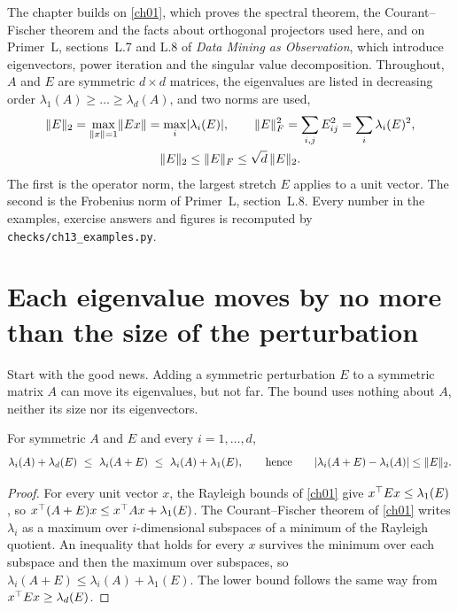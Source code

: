 The chapter builds on \cref{ch01}, which proves the spectral theorem, the
Courant--Fischer theorem and the facts about orthogonal projectors used here,
and on Primer~L, sections~L.7 and L.8 of \emph{Data Mining as Observation},
which introduce eigenvectors, power iteration and the singular value
decomposition. Throughout, $A$ and $E$ are symmetric $d\times d$ matrices, the
eigenvalues are listed in decreasing order $\lambda_1(A)\ge\dots\ge\lambda_d(A)$,
and two norms are used,
\begin{equation}\label{eq:ch13:norms}
\begin{gathered}
\lVert E\rVert_2=\max_{\lVert x\rVert=1}\lVert Ex\rVert=\max_i\lvert \lambda_i(E)\rvert,\qquad
\lVert E\rVert_F^2=\sum_{i,j}E_{ij}^2=\sum_i\lambda_i(E)^2,\\
\lVert E\rVert_2\le\lVert E\rVert_F\le\sqrt d\,\lVert E\rVert_2 .
\end{gathered}
\end{equation}
The first is the operator norm, the largest stretch $E$ applies to a unit
vector. The second is the Frobenius norm of Primer~L, section~L.8. Every number
in the examples, exercise answers and figures is recomputed by
\texttt{checks/ch13\_examples.py}.

\section{Each eigenvalue moves by no more than the size of the perturbation}\label{sec:ch13:weyl}

Start with the good news. Adding a symmetric perturbation $E$ to a symmetric
matrix $A$ can move its eigenvalues, but not far. The bound uses nothing about
$A$, neither its size nor its eigenvectors.

\begin{theorem}\label{thm:ch13:weyl}
For symmetric $A$ and $E$ and every $i=1,\dots,d$,
\begin{equation}\label{eq:ch13:weyl}
\lambda_i(A)+\lambda_d(E)\ \le\ \lambda_i(A+E)\ \le\ \lambda_i(A)+\lambda_1(E),
\qquad\text{hence}\qquad
\abs{\lambda_i(A+E)-\lambda_i(A)}\le\norm{E}_2 .
\end{equation}
\end{theorem}

\begin{proof}
For every unit vector $x$, the Rayleigh bounds of \cref{ch01} give
$x^{\top} Ex\le\lambda_1(E)$, so $x^{\top}(A+E)x\le x^{\top} Ax+\lambda_1(E)$. The
Courant--Fischer theorem of \cref{ch01} writes $\lambda_i$ as a maximum over
$i$-dimensional subspaces of a minimum of the Rayleigh quotient. An inequality
that holds for every $x$ survives the minimum over each subspace and then the
maximum over subspaces, so $\lambda_i(A+E)\le\lambda_i(A)+\lambda_1(E)$. The
lower bound follows the same way from $x^{\top} Ex\ge\lambda_d(E)$.
\end{proof}

